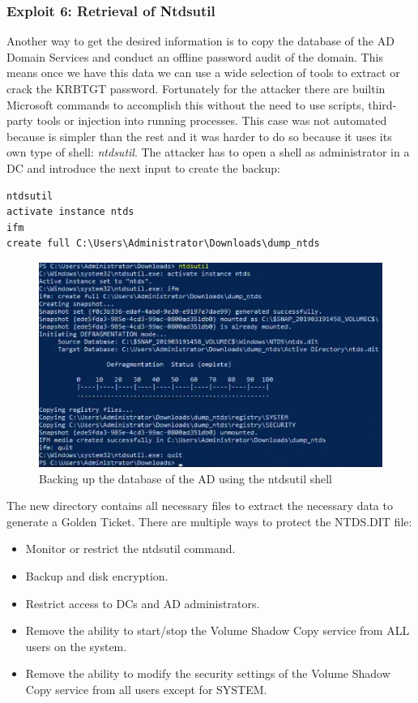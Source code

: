 \subsubsection{Exploit 6: Retrieval of Ntdsutil}
Another way to get the desired information is to copy the database of the AD Domain Services and conduct an offline password audit of the domain. This means once we have this data we can use a wide selection of tools to extract or crack the KRBTGT password.
Fortunately for the attacker there are builtin Microsoft commands to accomplish this without the need to use scripts, third-party tools or injection into running processes\cite{ntdsdit_tools}\cite{ntdsutil_cyberis}\cite{dump_ways}\cite{extracting_ntds}\cite{ntds_powershell}.
\linej
\linej
This case was not automated because is simpler than the rest and it was harder to do so because it uses its own type of shell: \textit{ntdsutil}.
The attacker has to open a shell as administrator in a DC and introduce the next input to create the backup:
\begin{lstlisting}[style=PS,frame=none]
ntdsutil
activate instance ntds
ifm
create full C:\Users\Administrator\Downloads\dump_ntds
\end{lstlisting}
\begin{figure}[H]
	\centering
	\includegraphics[width=\textwidth]{figuras/ntdsutil.png}
	\caption{Backing up the database of the AD using the ntdsutil shell}
\end{figure}
The new directory contains all necessary files to extract the necessary data to generate a Golden Ticket.
\linej
\linej
There are multiple ways to protect the NTDS.DIT file\cite{protect_NTDS}\cite{hood}:
\begin{itemize}
	\item Monitor or restrict the ntdsutil command.
	\item Backup and disk encryption.
	\item Restrict access to DCs and AD administrators.
	\item Remove the ability to start/stop the Volume Shadow Copy service from ALL users on the system.
	\item Remove the ability to modify the security settings of the Volume Shadow Copy service from all users except for SYSTEM.
\end{itemize}
